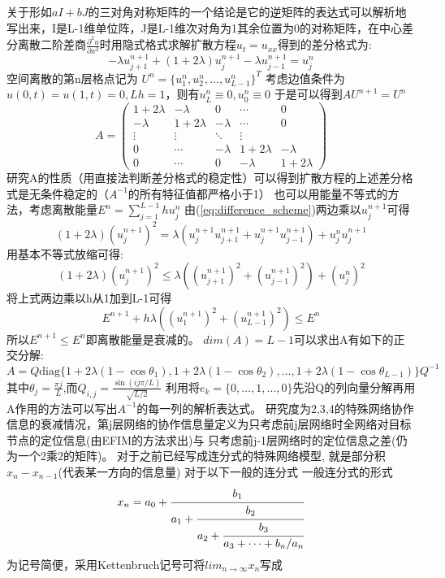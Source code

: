 \documentclass[12pt]{article}
\theoremstyle{remark}
\begin{document}
关于形如$aI+bJ$的三对角对称矩阵的一个结论是它的逆矩阵的表达式可以解析地写出来，I是L-1维单位阵，J是L-1维次对角为1其余位置为0的对称矩阵，在中心差分离散二阶差商$\frac{\partial^2 u}{\partial x^2}$时用隐式格式求解扩散方程$u_t=u_{xx}$得到的差分格式为:
\begin{equation}\label{eq:difference_scheme}
  -\lambda u^{n+1}_{j+1}+(1+2\lambda)u^{n+1}_j-\lambda u^{n+1}_{j-1}=u^n_j
\end{equation}
空间离散的第n层格点记为
$U^n=\{u_1^n,u_2^n,\dots,u_{L-1}^n\}^T$
考虑边值条件为$u(0,t)=u(1,t)=0,Lh=1$，则有$u^n_L\equiv 0,u_0^n\equiv 0$
于是可以得到$AU^{n+1}=U^n$
\[A=\begin{pmatrix}
  1+2\lambda & -\lambda & 0 & \cdots & 0 \\
  -\lambda & 1+2\lambda & -\lambda & \cdots & 0 \\
  \vdots  & \vdots  & \ddots & \vdots  \\
  0 & \cdots & -\lambda & 1+2\lambda & -\lambda\\
  0 & \cdots & 0 &-\lambda& 1+2\lambda
 \end{pmatrix}
 \]研究A的性质（用直接法判断差分格式的稳定性）可以得到扩散方程的上述差分格式是无条件稳定的（$A^{-1}$的所有特征值都严格小于1）
也可以用能量不等式的方法，考虑离散能量$E^n=\sum_{j=1}^{L-1} hu_j^n$
由(\ref{eq:difference_scheme})两边乘以$u_j^{n+1}$可得
\begin{equation}
(1+2\lambda)(u_j^{n+1})^2=\lambda(u_j^{n+1}u_{j+1}^{n+1}+u_j^{n+1}u_{j-1}^{n+1})+u_j^nu_j^{n+1}
\end{equation}
用基本不等式放缩可得:
\[
(1+2\lambda)(u_j^{n+1})^2\leq \lambda((u_{j+1}^{n+1})^2+(u_{j-1}^{n+1})^2)+(u_j^n)^2
\]
将上式两边乘以h从1加到L-1可得
\[
E^{n+1}+h\lambda((u_1^{n+1})^2+(u_{L-1}^{n+1})^2)\leq E^{n}
\]
所以$E^{n+1}\leq E^n$即离散能量是衰减的。
$dim(A)=L-1$可以求出A有如下的正交分解:
\[
A=Q\text{diag}\{1+2\lambda(1-\cos\theta_1),1+2\lambda(1-\cos\theta_2),\dots,1+2\lambda(1-\cos\theta_{L-1})\}Q^{-1}
\]
其中$\theta_j=\frac{\pi j}{L}$,而$Q_{i,j}=\frac{\sin(ij\pi/L)}{\sqrt{L/2}}$
利用将$e_k=\{0,\dots,1,\dots,0\}$先沿Q的列向量分解再用A作用的方法可以写出$A^{-1}$的每一列的解析表达式。
研究度为2,3,4的特殊网络协作信息的衰减情况，第j层网络的协作信息量定义为只考虑前j层网络时全网络对目标节点的定位信息(由EFIM的方法求出)与
只考虑前j-1层网络时的定位信息之差(仍为一个2乘2的矩阵)。
对于之前已经写成连分式的特殊网络模型,
就是部分积$x_n-x_{n-1}$(代表某一方向的信息量)
对于以下一般的连分式
一般连分式的形式\[
x_n=a_0+\cfrac{b_1}{a_1+\cfrac{b_2}{a_2+\cfrac{b_3}{a_3+\cdots+b_n/a_n}}}
\]
为记号简便，采用Kettenbruch记号可将$lim_{n\to\infty}x_n$写成
\end{document}

